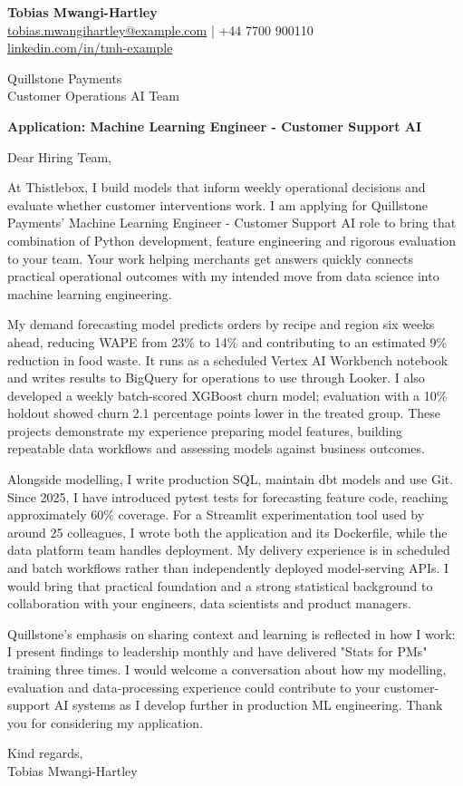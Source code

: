 \documentclass[11pt,a4paper]{article}
\begin{document}
{\large\bfseries\color{primarycolor} Tobias Mwangi-Hartley}\\
\href{mailto:tobias.mwangihartley@example.com}{tobias.mwangihartley@example.com} | +44 7700 900110\\
\href{https://linkedin.com/in/tmh-example}{linkedin.com/in/tmh-example}

Quillstone Payments\\
Customer Operations AI Team

\textbf{Application: Machine Learning Engineer - Customer Support AI}

Dear Hiring Team,

At Thistlebox, I build models that inform weekly operational decisions and evaluate whether customer interventions work. I am applying for Quillstone Payments' Machine Learning Engineer - Customer Support AI role to bring that combination of Python development, feature engineering and rigorous evaluation to your team. Your work helping merchants get answers quickly connects practical operational outcomes with my intended move from data science into machine learning engineering.

My demand forecasting model predicts orders by recipe and region six weeks ahead, reducing WAPE from 23\% to 14\% and contributing to an estimated 9\% reduction in food waste. It runs as a scheduled Vertex AI Workbench notebook and writes results to BigQuery for operations to use through Looker. I also developed a weekly batch-scored XGBoost churn model; evaluation with a 10\% holdout showed churn 2.1 percentage points lower in the treated group. These projects demonstrate my experience preparing model features, building repeatable data workflows and assessing models against business outcomes.

Alongside modelling, I write production SQL, maintain dbt models and use Git. Since 2025, I have introduced pytest tests for forecasting feature code, reaching approximately 60\% coverage. For a Streamlit experimentation tool used by around 25 colleagues, I wrote both the application and its Dockerfile, while the data platform team handles deployment. My delivery experience is in scheduled and batch workflows rather than independently deployed model-serving APIs. I would bring that practical foundation and a strong statistical background to collaboration with your engineers, data scientists and product managers.

Quillstone's emphasis on sharing context and learning is reflected in how I work: I present findings to leadership monthly and have delivered "Stats for PMs" training three times. I would welcome a conversation about how my modelling, evaluation and data-processing experience could contribute to your customer-support AI systems as I develop further in production ML engineering. Thank you for considering my application.

Kind regards,\\
Tobias Mwangi-Hartley
\end{document}
